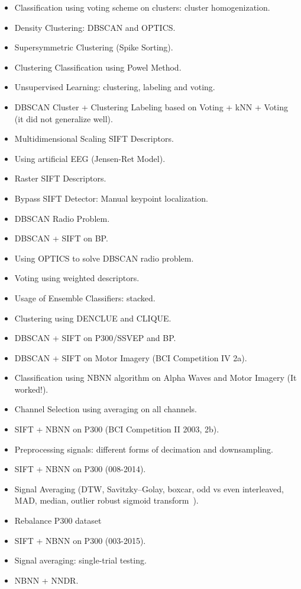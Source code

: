 \begin{itemize}
\item Classification using voting scheme on clusters:  cluster homogenization.
\item Density Clustering: DBSCAN and OPTICS.
\item Supersymmetric Clustering (Spike Sorting).
\item Clustering Classification using Powel Method.
\item Unsupervised Learning: clustering, labeling and voting.
\item DBSCAN Cluster + Clustering Labeling based on Voting + kNN + Voting (it did not generalize well).
\item Multidimensional Scaling SIFT Descriptors.
\item Using artificial EEG (Jensen-Ret Model).
\item Raster SIFT Descriptors.
\item Bypass SIFT Detector: Manual keypoint localization.
\item DBSCAN Radio Problem.
\item DBSCAN + SIFT on BP.
\item Using OPTICS to solve DBSCAN radio problem.
\item Voting using weighted descriptors.
\item Usage of Ensemble Classifiers: stacked.
\item Clustering using DENCLUE and CLIQUE.
\item DBSCAN + SIFT on P300/SSVEP and BP.
\item DBSCAN + SIFT on Motor Imagery (BCI Competition IV 2a).
\item Classification using NBNN algorithm on Alpha Waves and Motor Imagery (It worked!).
\item Channel Selection using averaging on all channels.
\item SIFT + NBNN on P300 (BCI Competition II 2003, 2b).
\item Preprocessing signals: different forms of decimation and downsampling.
\item SIFT + NBNN on P300 (008-2014).
\item Signal Averaging (DTW, Savitzky–Golay, boxcar, odd vs even interleaved, MAD, median, outlier robust sigmoid transform~\cite{Fulcher2014}).
\item Rebalance P300 dataset~\cite{Tibon2015}
\item SIFT + NBNN on P300 (003-2015).
\item Signal averaging: single-trial testing.
\item NBNN + NNDR.

\end{itemize}
